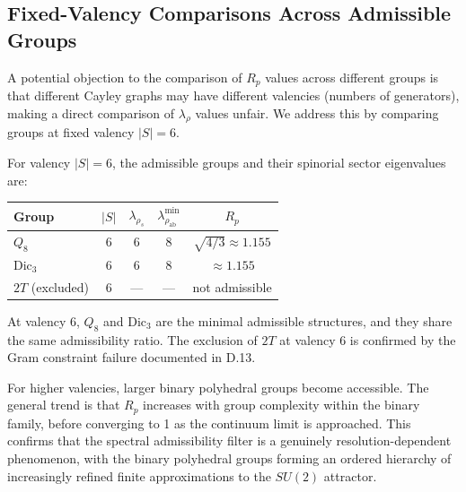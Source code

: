 \subsection{Fixed-Valency Comparisons Across Admissible Groups}
\label{subsec:fixed-valency-comparisons}

A potential objection to the comparison of $R_p$ values across different groups is
that different Cayley graphs may have different valencies (numbers of generators),
making a direct comparison of $\lambda_\rho$ values unfair.
We address this by comparing groups at fixed valency $|S|=6$.

For valency $|S|=6$, the admissible groups and their spinorial sector eigenvalues are:

\begin{center}
  \begin{tabular}{lcccc}
    \hline
    Group & $|S|$ & $\lambda_{\rho_s}$ & $\lambda_{\rho_{\mathrm{ab}}}^{\min}$
    & $R_p$ \\
    \hline
    $Q_8$ & 6 & 6 & 8 & $\sqrt{4/3}\approx 1.155$ \\
    $\mathrm{Dic}_3$ & 6 & 6 & 8 & $\approx 1.155$ \\
    $2T$ (excluded) & 6 & --- & --- & not admissible \\
    \hline
  \end{tabular}
\end{center}

At valency 6, $Q_8$ and $\mathrm{Dic}_3$ are the minimal admissible structures,
and they share the same admissibility ratio.
The exclusion of $2T$ at valency 6 is confirmed by the Gram constraint failure
documented in D.13.

For higher valencies, larger binary polyhedral groups become accessible.
The general trend is that $R_p$ increases with group complexity within the binary
family, before converging to 1 as the continuum limit is approached.
This confirms that the spectral admissibility filter is a genuinely resolution-dependent
phenomenon, with the binary polyhedral groups forming an ordered hierarchy of
increasingly refined finite approximations to the $SU(2)$ attractor.
